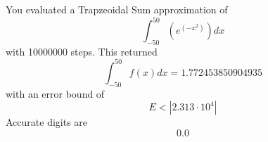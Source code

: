 \documentclass{article}
\begin{document}
You evaluated a Trapzeoidal Sum approximation of $$\int_{-50}^{50}\left(e^{\left(-x^{2}\right)}\right)dx$$ with 10000000 steps.
This returned$$\int_{-50}^{50}f(x)dx=1.772453850904935$$ with an error bound of $$E<|2.313\cdot 10^{4}|$$Accurate digits are $$0.0$$
\end{document}
